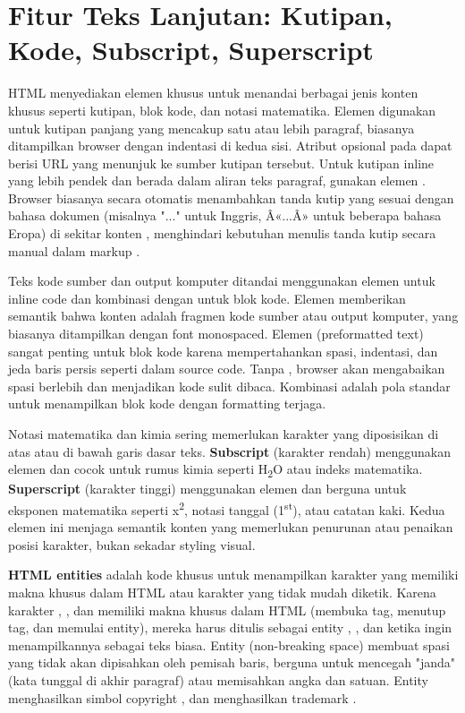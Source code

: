 ﻿\section{Fitur Teks Lanjutan: Kutipan, Kode, Subscript, Superscript}

HTML menyediakan elemen khusus untuk menandai berbagai jenis konten khusus seperti kutipan, blok kode, dan notasi matematika. Elemen  digunakan untuk kutipan panjang yang mencakup satu atau lebih paragraf, biasanya ditampilkan browser dengan indentasi di kedua sisi. Atribut opsional  pada  dapat berisi URL yang menunjuk ke sumber kutipan tersebut. Untuk kutipan inline yang lebih pendek dan berada dalam aliran teks paragraf, gunakan elemen . Browser biasanya secara otomatis menambahkan tanda kutip yang sesuai dengan bahasa dokumen (misalnya "..." untuk Inggris, Â«...Â» untuk beberapa bahasa Eropa) di sekitar konten , menghindari kebutuhan menulis tanda kutip secara manual dalam markup \cite{mdnHtmlIntro}.

Teks kode sumber dan output komputer ditandai menggunakan elemen  untuk inline code dan kombinasi  dengan  untuk blok kode. Elemen  memberikan semantik bahwa konten adalah fragmen kode sumber atau output komputer, yang biasanya ditampilkan dengan font monospaced. Elemen  (preformatted text) sangat penting untuk blok kode karena mempertahankan spasi, indentasi, dan jeda baris persis seperti dalam source code. Tanpa , browser akan mengabaikan spasi berlebih dan menjadikan kode sulit dibaca. Kombinasi  adalah pola standar untuk menampilkan blok kode dengan formatting terjaga.

Notasi matematika dan kimia sering memerlukan karakter yang diposisikan di atas atau di bawah garis dasar teks. \textbf{Subscript} (karakter rendah) menggunakan elemen  dan cocok untuk rumus kimia seperti H\textsubscript{2}O atau indeks matematika. \textbf{Superscript} (karakter tinggi) menggunakan elemen  dan berguna untuk eksponen matematika seperti x\textsuperscript{2}, notasi tanggal (1\textsuperscript{st}), atau catatan kaki. Kedua elemen ini menjaga semantik konten yang memerlukan penurunan atau penaikan posisi karakter, bukan sekadar styling visual.

\textbf{HTML entities} adalah kode khusus untuk menampilkan karakter yang memiliki makna khusus dalam HTML atau karakter yang tidak mudah diketik. Karena karakter \code{<}, \code{>}, dan  memiliki makna khusus dalam HTML (membuka tag, menutup tag, dan memulai entity), mereka harus ditulis sebagai entity , , dan  ketika ingin menampilkannya sebagai teks biasa. Entity  (non-breaking space) membuat spasi yang tidak akan dipisahkan oleh pemisah baris, berguna untuk mencegah "janda" (kata tunggal di akhir paragraf) atau memisahkan angka dan satuan. Entity  menghasilkan simbol copyright \textcopyright, dan  menghasilkan trademark \textregistered.

